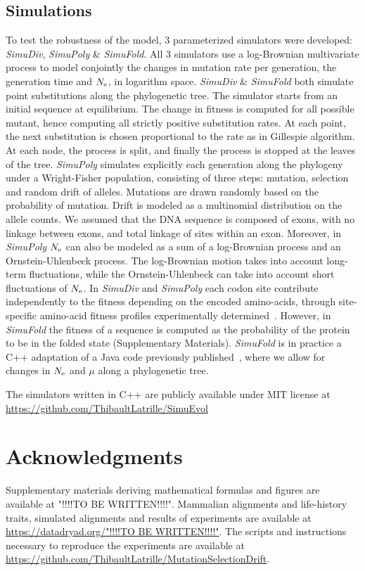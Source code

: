 \subsection{Simulations}
\label{sec:Simulation}
To test the robustness of the model, $3$ parameterized simulators were developed: \textit{SimuDiv}, \textit{SimuPoly} \& \textit{SimuFold}.
All $3$ simulators use a log-Brownian multivariate process to model conjointly the changes in mutation rate per generation, the generation time and $N_{\mathrm{e}}$, in logarithm space.
\textit{SimuDiv} \& \textit{SimuFold} both simulate point \glspl{substitution} along the phylogenetic tree.
The simulator starts from an initial sequence at equilibrium.
The change in fitness is computed for all possible mutant, hence computing all strictly positive \gls{substitution} rates.
At each point, the next \gls{substitution} is chosen proportional to the rate as in Gillespie algorithm.
At each node, the process is split, and finally the process is stopped at the leaves of the tree.
\textit{SimuPoly} simulates explicitly each generation along the phylogeny under a Wright-Fisher population, consisting of three steps: mutation, selection and random drift of \glspl{allele}.
Mutations are drawn randomly based on the probability of mutation.
Drift is modeled as a multinomial distribution on the \gls{allele} counts.
We assumed that the \acrshort{DNA} sequence is composed of exons, with no linkage between exons, and total linkage of sites within an exon.
Moreover, in \textit{SimuPoly} $N_{\mathrm{e}}$ can also be modeled as a sum of a log-Brownian process and an Ornstein-Uhlenbeck process.
The log-Brownian motion takes into account long-term fluctuations, while the Ornstein-Uhlenbeck can take into account short fluctuations of $N_{\mathrm{e}}$.
In \textit{SimuDiv} and \textit{SimuPoly} each \gls{codon} site contribute independently to the fitness depending on the encoded amino-acids, through site-specific amino-acid fitness profiles experimentally determined~\citep{Bloom2017}.
However, in \textit{SimuFold} the fitness of a sequence is computed as the probability of the protein to be in the folded state (Supplementary Materials).
\textit{SimuFold} is in practice a C++ adaptation of a Java code previously published~\citep{Goldstein2016, Goldstein2017}, where we allow for changes in $N_{\mathrm{e}}$ and $\mu$ along a phylogenetic tree.

The simulators written in C++ are publicly available under MIT license at \url{https://github.com/ThibaultLatrille/SimuEvol}

\section{Acknowledgments}
Supplementary materials deriving mathematical formulas and figures are available at "!!!!TO BE WRITTEN!!!!".
Mammalian alignments and life-history traits, simulated alignments and results of experiments are available at \url{https://datadryad.org/"!!!!TO BE WRITTEN!!!!"}.
The scripts and instructions necessary to reproduce the experiments are available at \url{https://github.com/ThibaultLatrille/MutationSelectionDrift}.


